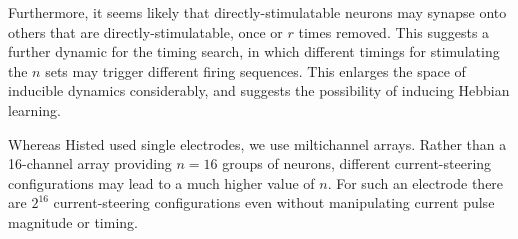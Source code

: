 \documentclass[10pt,letterpaper]{article}
\begin{document}
Furthermore, it seems likely that directly-stimulatable neurons may synapse onto others that are directly-stimulatable, once or $r$ times removed.  This suggests a further dynamic for the timing search, in which different timings for stimulating the $n$ sets may trigger different firing sequences.  This enlarges the space of inducible dynamics considerably, and suggests the possibility of inducing Hebbian learning.

Whereas Histed used single electrodes, we use miltichannel arrays.  Rather than a 16-channel array providing $n=16$ groups of neurons, different current-steering configurations may lead to a much higher value of $n$.  For such an electrode there are $2^{16}$ current-steering configurations even without manipulating current pulse magnitude or timing.


\end{document}
